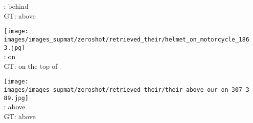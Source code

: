 \documentclass[10pt,twocolumn,letterpaper]{article}
\begin{document}
\begin{figure*}[t]
\begin{minipage}[t]{0.185\textwidth}
       \cite{Lu16}: behind \\
       GT: above
       \vspace{0.2ex}
    \end{minipage}
    \hspace{0.005\textwidth}
    \begin{minipage}[t]{0.185\textwidth}
    	\centering
       	\texttt{[image: images/images\_supmat/zeroshot/retrieved\_their/helmet\_on\_motorcycle\_1863.jpg]}\\
       	\vspace{0.3ex}
       	\cite{Lu16}: on \\
       	GT: on the top of
       	\vspace{0.2ex}
    \end{minipage}
    \hspace{0.005\textwidth} 
    \begin{minipage}[t]{0.185\textwidth}
    	\centering
       	\texttt{[image: images/images\_supmat/zeroshot/retrieved\_their/their\_above\_our\_on\_307\_389.jpg]}\\
       	\vspace{0.3ex}
       	\cite{Lu16}: above \\
       	GT: above
      	\vspace{0.2ex}
    \end{minipage}  


\end{figure*}
\end{document}
